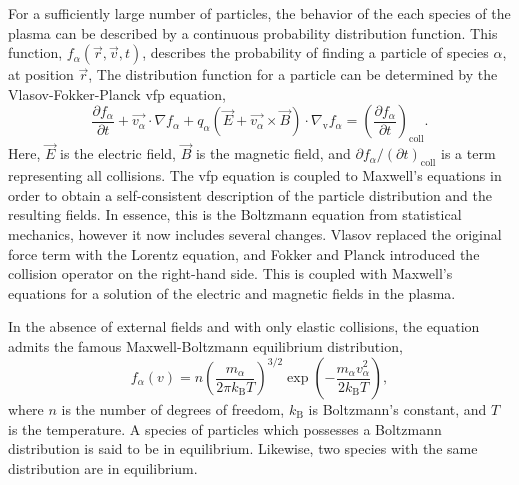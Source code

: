 
For a sufficiently large number of particles, the behavior of the each species
of the plasma can be described by a continuous probability distribution
function. This function, $f_\alpha(\vec{r}, \vec{v}, t)$, describes the
probability of finding a particle of species $\alpha$, at position $\vec{r}$,
The distribution function for a particle can be determined by the
Vlasov-Fokker-Planck \acs{vfp} equation,
\begin{equation}\label{eq:vfp}
  \frac{\partial f_\alpha}{\partial t} + \vec{v_\alpha}\cdot\nabla f_\alpha +
  q_\alpha \left(\vec{E} + \vec{v_\alpha}\times\vec{B}\right)
  \cdot \nabla_\mathrm{v} f_\alpha = \left( \frac{\partial f_\alpha}
  {\partial t}\right)_\mathrm{coll}.
\end{equation}
Here, $\vec{E}$ is the electric field, $\vec{B}$ is the magnetic field, and
$\partial f_\alpha/(\partial t)_\mathrm{coll}$ is a term representing all
collisions. The \acs{vfp} equation is coupled to Maxwell's equations in order to
obtain a self-consistent description of the particle distribution and the
resulting fields. In essence, this is the Boltzmann equation from statistical
mechanics, however it now includes several changes. Vlasov replaced the original
force term with the Lorentz equation, and Fokker and Planck introduced the
collision operator on the right-hand side. This is coupled with Maxwell's
equations for a solution of the electric and magnetic fields in the plasma.

In the absence of external fields and with only elastic collisions, the equation
admits the famous Maxwell-Boltzmann equilibrium distribution,
\begin{equation}\label{eq:mb}
  f_\alpha(v) = n\left(\frac{m_\alpha}{2\pi k_\mathrm{B}T}\right)^{3/2}
    \exp\left(-\frac{m_\alpha v_\alpha^2}{2k_\mathrm{B}T}\right),
\end{equation}
where $n$ is the number of degrees of freedom, $k_\mathrm{B}$ is Boltzmann's
constant, and $T$ is the temperature. A species of particles which possesses a
Boltzmann distribution is said to be in equilibrium. Likewise, two species with
the same distribution are in equilibrium.


